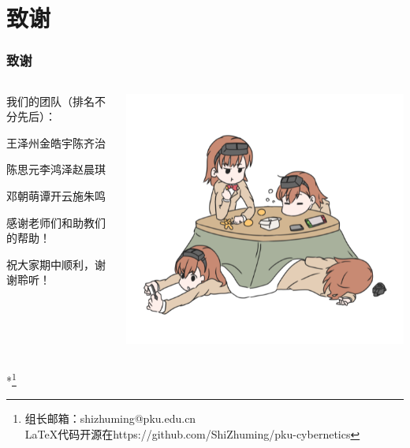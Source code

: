 \documentclass[12pt,AutoFakeBold,aspectratio=43,mathserif]{beamer}
\begin{document}
    \section*{致谢}

    \begin{frame}
        \frametitle{致谢}
        \begin{columns}
            \begin{column}{.5\linewidth}
                我们的团队（排名不分先后）：

                王泽州\quad 金皓宇\quad 陈齐治
        
                陈思元\quad 李鸿泽\quad 赵晨琪
                
                邓朝萌\quad 谭开云\quad 施朱鸣
            
                \bigskip

                感谢老师们和助教们的帮助！

                祝大家期中顺利，谢谢聆听！
            \end{column}
            \begin{column}{.5\linewidth}
                \includegraphics[width=.4\paperwidth]{figures/misaka558.png}
            \end{column}
        \end{columns}
        *\footnote{组长邮箱：shizhuming@pku.edu.cn \\ LaTeX代码开源在https://github.com/ShiZhuming/pku-cybernetics}
    \end{frame}
    
\end{document}
